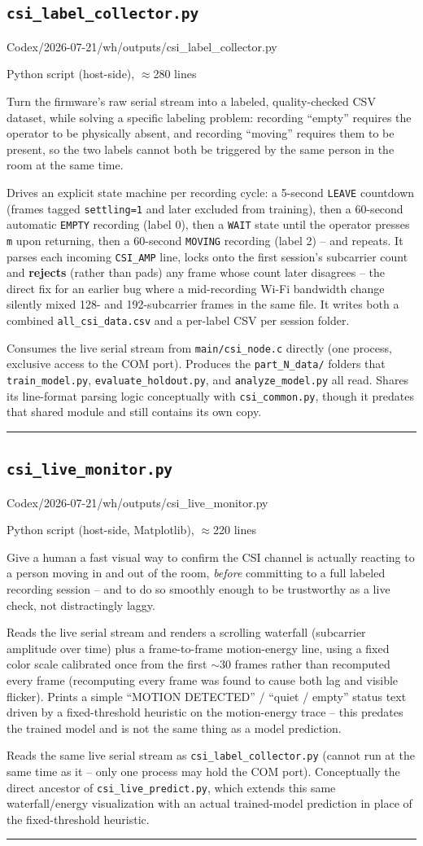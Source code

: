 \documentclass[11pt,a4paper]{article}
\newcommand{\filepath}[1]{{\small\ttfamily\color{pathgray}#1}}
\newcommand{\fileentry}[6]{%
    \subsection{\texttt{#1}}
    \filepath{#2}
    \vspace{0.15cm}
    \begin{description}[leftmargin=2.6cm, style=nextline]
        \item[Type] #3
        \item[Objective] #4
        \item[Role] #5
        \item[Connections] #6
    \end{description}
    \vspace{0.2cm}
    \hrule
    \vspace{0.3cm}
}
\begin{document}
\fileentry
{csi\_label\_collector.py}
{Codex/2026-07-21/wh/outputs/csi\_label\_collector.py}
{Python script (host-side), \(\approx\)280 lines}
{Turn the firmware's raw serial stream into a labeled, quality-checked
    CSV dataset, while solving a specific labeling problem: recording
    ``empty'' requires the operator to be physically absent, and
    recording ``moving'' requires them to be present, so the two labels
    cannot both be triggered by the same person in the room at the same
    time.}
{Drives an explicit state machine per recording cycle: a 5-second
    \texttt{LEAVE} countdown (frames tagged \texttt{settling=1} and
    later excluded from training), then a 60-second automatic
    \texttt{EMPTY} recording (label 0), then a \texttt{WAIT} state until
    the operator presses \texttt{m} upon returning, then a 60-second
    \texttt{MOVING} recording (label 2) -- and repeats. It parses each
    incoming \texttt{CSI\_AMP} line, locks onto the first
    session's subcarrier count and \textbf{rejects} (rather than pads)
    any frame whose count later disagrees -- the direct fix for an
    earlier bug where a mid-recording Wi-Fi bandwidth change silently
    mixed 128- and 192-subcarrier frames in the same file. It writes
    both a combined \texttt{all\_csi\_data.csv} and a per-label CSV per
    session folder.}
{Consumes the live serial stream from \texttt{main/csi\_node.c} directly
    (one process, exclusive access to the COM port). Produces the
    \texttt{part\_N\_data/} folders that \texttt{train\_model.py},
    \texttt{evaluate\_holdout.py}, and \texttt{analyze\_model.py} all
    read. Shares its line-format parsing logic conceptually with
    \texttt{csi\_common.py}, though it predates that shared module and
    still contains its own copy.}

\fileentry
{csi\_live\_monitor.py}
{Codex/2026-07-21/wh/outputs/csi\_live\_monitor.py}
{Python script (host-side, Matplotlib), \(\approx\)220 lines}
{Give a human a fast visual way to confirm the CSI channel is actually
    reacting to a person moving in and out of the room, \emph{before}
    committing to a full labeled recording session -- and to do so
    smoothly enough to be trustworthy as a live check, not distractingly
    laggy.}
{Reads the live serial stream and renders a scrolling waterfall
    (subcarrier amplitude over time) plus a frame-to-frame motion-energy
    line, using a fixed color scale calibrated once from the first
    \(\sim\)30 frames rather than recomputed every frame (recomputing
    every frame was found to cause both lag and visible flicker). Prints
    a simple ``MOTION DETECTED'' / ``quiet / empty'' status text driven
    by a fixed-threshold heuristic on the motion-energy trace -- this
    predates the trained model and is not the same thing as a model
    prediction.}
{Reads the same live serial stream as \texttt{csi\_label\_collector.py}
    (cannot run at the same time as it -- only one process may hold the
    COM port). Conceptually the direct ancestor of
    \texttt{csi\_live\_predict.py}, which extends this same
    waterfall/energy visualization with an actual trained-model
    prediction in place of the fixed-threshold heuristic.}
\end{document}
